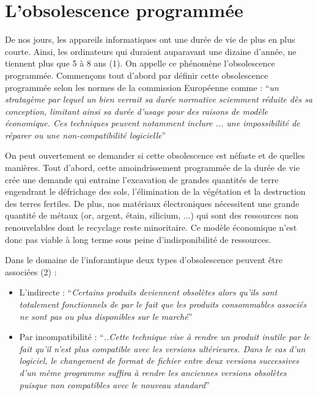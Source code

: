 \documentclass[10pt]{../fiche}
\begin{document}
\section*{L'obsolescence programmée}

De nos jours, les appareils informatiques ont une durée de vie de plus en plus courte. Ainsi, les ordinateurs qui duraient auparavant une dizaine d'année, ne tiennent plus que 5 à 8 ans (1). On appelle ce phénomène l'obsolescence programmée. Commençons tout d'abord par définir  cette obsolescence programmée selon les normes de la commission
Européenne comme :
``\textit{un stratagème par lequel un bien verrait sa durée
normative sciemment réduite dès sa conception, limitant
ainsi sa durée d'usage pour des raisons de modèle économique.
Ces techniques peuvent notamment inclure
... une impossibilité de réparer ou une non-compatibilité
logicielle}''

On peut ouvertement se demander si cette obsolescence est néfaste et de quelles manières. Tout d'abord, cette amoindrissement programmée de la durée de vie crée une demande qui entraine l'excavation de grandes quantités de terre engendrant le défrichage des sols, l'élimination de la végétation et la destruction des terres fertiles. De plus, nos matériaux électroniques nécessitent une grande quantité de métaux (or, argent, étain, silicium, ...) qui sont des ressources non renouvelables dont le recyclage reste minoritaire. Ce modèle économique n'est donc pas viable à long terme sous peine d'indisponibilité de ressources.

Dans le domaine de l'inforamtique deux types d'obsolescence peuvent être associées (2) :
\begin{itemize}
  \item L'indirecte : ``\textit{Certains produits deviennent obsolètes alors qu'ils sont totalement fonctionnels de par le fait que les produits consommables associés ne sont pas ou plus disponibles sur le marché}''

  \item Par incompatibilité : ``\textit{..Cette technique vise à rendre un produit inutile par le fait qu'il n'est plus compatible
    avec les versions ultérieures. Dans le cas d'un logiciel, le changement de format de fichier entre deux versions successives d'un même programme suffira à rendre les anciennes versions obsolètes puisque non compatibles avec le nouveau standard}''
\end{itemize}
\end{document}
